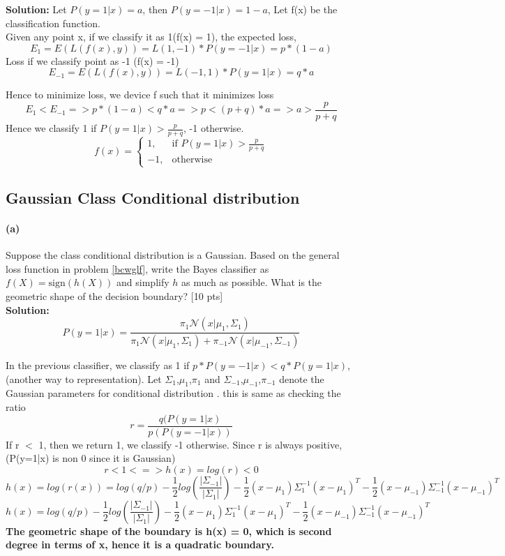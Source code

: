 \documentclass[twoside,10pt]{article}
\begin{document}
\textbf{ Solution: } 
Let $P(y=1|x) = a$, then $P(y=-1|x) = 1-a$,
Let f(x) be the classification function.\\
Given any point x, if we classify it as 1(f(x) = 1), the expected loss,
$$ E_1 = E(L(f(x),y)) = L(1,-1)* P(y=-1|x) = p * (1-a)$$
Loss if we classify point as -1 (f(x) = -1)
$$ E_{-1} = E(L(f(x),y)) = L(-1,1)* P(y=1|x) = q * a $$

Hence to minimize loss, we device f such that it minimizes loss
$$ E_1 < E_{-1} =>   p * (1-a) < q*a => p < (p+q)*a => a > \frac{p}{p+q}$$
Hence we classify 1 if $P(y=1|x) > \frac{p}{p+q} $, -1 otherwise.
$$\boxed{f(x) = \begin{cases}
    1,& \text{if } P(y=1|x) > \frac{p}{p+q}\\
    -1,              & \text{otherwise}
\end{cases}}$$

\subsection{Gaussian Class Conditional distribution}
\paragraph{(a)} Suppose the class conditional distribution is a Gaussian.
Based on the general loss function in problem \ref{bcwglf}, write
the Bayes classifier as $f(X) = \text{sign}(h(X))$ and simplify $h$
as much as possible. What is the geometric shape of the decision
boundary? [10 pts]\\
\textbf{ Solution: } 
$$P(y=1|x) = \frac{\pi_1 \mathcal{N}{(x|\mu_1,\Sigma_1)} }{\pi_1 \mathcal{N}{(x|\mu_1,\Sigma_1)} + \pi_{-1} \mathcal{N}{(x|\mu_{-1},\Sigma_{-1})} }$$

In the previous classifier, we classify as 1 if $p*P(y = -1|x) < q*P(y = 1|x)$, (another way to representation).
Let $\Sigma_1$,$\mu_1$,$\pi_1$ and $\Sigma_{-1}$,$\mu_{-1}$,$\pi_{-1}$ denote the Gaussian parameters for conditional distribution .
this is same as checking the ratio
$$r = \frac{q(P(y=1|x)}{p(P(y=-1|x))} $$
If r $<$ 1, then we return 1, we classify -1 otherwise.
Since r is always positive, (P(y=1|x) is non 0 since it is Gaussian)
$$ r<1 <=> h(x) = log(r) < 0 $$
$$h(x) = log(r(x)) = log(q/p)  - \frac{1}{2}log(\frac{|\Sigma_{-1}|}{|\Sigma_{1}|})- \frac{1}{2}(x-\mu_1)\Sigma_1^{-1}(x-\mu_1)^T- \frac{1}{2}(x-\mu_{-1})\Sigma_{-1}^{-1}(x-\mu_{-1})^T$$
$$\boxed{h(x) = log(q/p)  - \frac{1}{2}log(\frac{|\Sigma_{-1}|}{|\Sigma_{1}|})- \frac{1}{2}(x-\mu_1)\Sigma_1^{-1}(x-\mu_1)^T- \frac{1}{2}(x-\mu_{-1})\Sigma_{-1}^{-1}(x-\mu_{-1})^T }$$
\textbf{The geometric shape of the boundary is h(x) = 0, which is second degree in terms of x, hence it is a quadratic boundary.}
\end{document}
